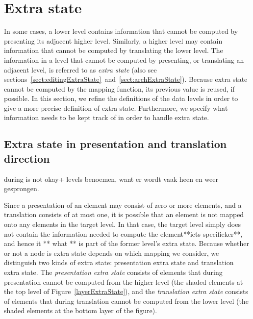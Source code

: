 %																
%																
%																
\section{Extra state} \label{sect:extraState}



In some cases, a lower level contains information that cannot be computed by presenting its adjacent higher level. Similarly, a higher level may contain information that cannot be computed by translating the lower level. The information in a level that cannot be computed by presenting, or translating an adjacent level, is referred to as {\em extra state} (also see sections~\ref{sect:editingExtraState}~and~\ref{sect:archExtraState}). Because extra state cannot be computed by the mapping function, its previous value is reused, if possible. In this section, we refine the definitions of the data levels in order to give a more precise definition of extra state. Furthermore, we specify what information needs to be kept track of in order to handle extra state.




%																
\subsection{Extra state in presentation and translation direction}

\bc
during is not okay+ levels benoemen, want er wordt vaak heen en weer gesprongen.

Since a presentation of an element may consist of zero or more elements, and a translation consists of at most one, it is possible that an element is not mapped onto any elements in the target level. In that case, the target level simply does not contain the information needed to compute the element**iets specifieker**, and hence it ** what ** is part of the former level's extra state. Because whether or not a node is extra state depends on which mapping we consider, we distinguish two kinds of extra state: presentation extra state and translation extra state. The {\em presentation extra state} consists of elements that during presentation cannot be computed from the higher level (the shaded elements at the top level of Figure~\ref{layerExtraState}), and the {\em translation extra state} consists of elements that during translation cannot be computed from the lower level (the shaded elements at the bottom layer of the figure).
\ec


